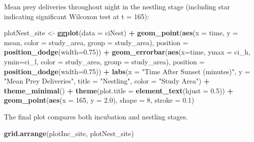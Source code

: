 \documentclass[]{article}
\newenvironment{Shaded}{\begin{snugshade}}{\end{snugshade}}
\newcommand{\DataTypeTok}[1]{\textcolor[rgb]{0.13,0.29,0.53}{#1}}
\newcommand{\DecValTok}[1]{\textcolor[rgb]{0.00,0.00,0.81}{#1}}
\newcommand{\FloatTok}[1]{\textcolor[rgb]{0.00,0.00,0.81}{#1}}
\newcommand{\KeywordTok}[1]{\textcolor[rgb]{0.13,0.29,0.53}{\textbf{#1}}}
\newcommand{\NormalTok}[1]{#1}
\newcommand{\OperatorTok}[1]{\textcolor[rgb]{0.81,0.36,0.00}{\textbf{#1}}}
\newcommand{\StringTok}[1]{\textcolor[rgb]{0.31,0.60,0.02}{#1}}
\begin{document}
Mean prey deliveries throughout night in the nestling stage (including
star indicating significant Wilcoxon test at t = 165):

\begin{Shaded}
\begin{Highlighting}[]
\NormalTok{plotNest_site <-}\StringTok{ }\KeywordTok{ggplot}\NormalTok{(}\DataTypeTok{data =}\NormalTok{ ciNest) }\OperatorTok{+}
\StringTok{  }\KeywordTok{geom_point}\NormalTok{(}\KeywordTok{aes}\NormalTok{(}\DataTypeTok{x =}\NormalTok{ time, }\DataTypeTok{y =}\NormalTok{ mean, }\DataTypeTok{color =}\NormalTok{ study_area, }\DataTypeTok{group =}\NormalTok{ study_area),}
             \DataTypeTok{position =} \KeywordTok{position_dodge}\NormalTok{(}\DataTypeTok{width=}\FloatTok{0.75}\NormalTok{)) }\OperatorTok{+}
\StringTok{  }\KeywordTok{geom_errorbar}\NormalTok{(}\KeywordTok{aes}\NormalTok{(}\DataTypeTok{x=}\NormalTok{time, }\DataTypeTok{ymax =}\NormalTok{ ci_h, }\DataTypeTok{ymin=}\NormalTok{ci_l, }\DataTypeTok{color =}\NormalTok{ study_area, }
                    \DataTypeTok{group =}\NormalTok{ study_area),}
                \DataTypeTok{position =} \KeywordTok{position_dodge}\NormalTok{(}\DataTypeTok{width=}\FloatTok{0.75}\NormalTok{)) }\OperatorTok{+}
\StringTok{  }\KeywordTok{labs}\NormalTok{(}\DataTypeTok{x =} \StringTok{"Time After Sunset (minutes)"}\NormalTok{, }\DataTypeTok{y =} \StringTok{"Mean Prey Deliveries"}\NormalTok{, }
       \DataTypeTok{title =} \StringTok{"Nestling"}\NormalTok{, }\DataTypeTok{color =} \StringTok{"Study Area"}\NormalTok{) }\OperatorTok{+}
\StringTok{  }\KeywordTok{theme_minimal}\NormalTok{() }\OperatorTok{+}
\StringTok{  }\KeywordTok{theme}\NormalTok{(}\DataTypeTok{plot.title =} \KeywordTok{element_text}\NormalTok{(}\DataTypeTok{hjust =} \FloatTok{0.5}\NormalTok{)) }\OperatorTok{+}
\StringTok{  }\KeywordTok{geom_point}\NormalTok{(}\KeywordTok{aes}\NormalTok{(}\DataTypeTok{x =} \DecValTok{165}\NormalTok{, }\DataTypeTok{y =} \FloatTok{2.0}\NormalTok{), }\DataTypeTok{shape =} \DecValTok{8}\NormalTok{, }\DataTypeTok{stroke =} \FloatTok{0.1}\NormalTok{)}
\end{Highlighting}
\end{Shaded}

The final plot compares both incubation and nestling stages.

\begin{Shaded}
\begin{Highlighting}[]
\KeywordTok{grid.arrange}\NormalTok{(plotInc_site, plotNest_site)}
\end{Highlighting}
\end{Shaded}
\end{document}

